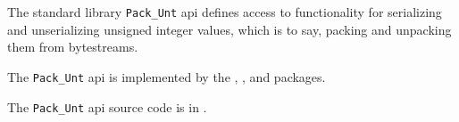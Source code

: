 
The standard library {\tt Pack\_Unt} api defines access to functionality for 
serializing and unserializing unsigned integer values, which is to say, 
packing and unpacking them from bytestreams.

The {\tt Pack\_Unt} api is implemented by the 
, 
, 
 and 
 packages.

The {\tt Pack\_Unt} api source code is in .


